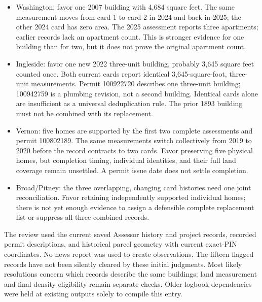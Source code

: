 \begin{itemize}
year. The measured house persists. The transient doubled land value should not
be summed across cards.
\item Washington: favor one 2007 building with 4,684 square feet. The same
measurement moves from card 1 to card 2 in 2024 and back in 2025; the other
2024 card has zero area. The 2025 assessment reports three apartments;
earlier records lack an apartment count. This is stronger evidence for one
building than for two, but it does not prove the original apartment count.
\item Ingleside: favor one new 2022 three-unit building, probably 3,645 square
feet counted once. Both current cards report identical 3,645-square-foot,
three-unit measurements. Permit 100922720 describes one three-unit building;
100942759 is a plumbing revision, not a second building. Identical cards alone
are insufficient as a universal deduplication rule. The prior 1893 building
must not be combined with its replacement.
\item Vernon: five homes are supported by the first two complete assessments
and permit 100802189. The same measurements switch collectively from 2019 to
2020 before the record contracts to two cards. Favor preserving five physical
homes, but completion timing, individual identities, and their full land coverage
remain unsettled. A permit issue date does not settle completion.
\item Broad/Pitney: the three overlapping, changing card histories need one
joint reconciliation. Favor retaining independently supported individual homes;
there is not yet enough evidence to assign a defensible complete replacement
list or suppress all three combined records.
\end{itemize}

The review used the current saved Assessor history and project records, recorded
permit descriptions, and historical parcel geometry with current exact-PIN
coordinates. No news report was used to create observations. The fifteen flagged
records have not been silently cleared by these initial judgments. Most likely
resolutions concern which records describe the same buildings; land measurement
and final density eligibility remain separate checks. Older logbook dependencies
were held at existing outputs solely to compile this entry.
